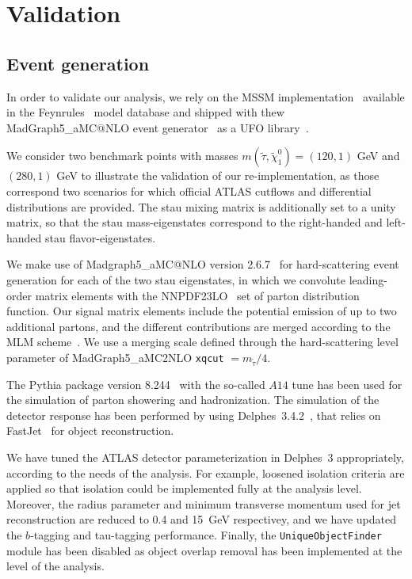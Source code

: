 \documentclass{ws-mpla}
\begin{document}
\section{Validation}\label{sec:val}

\subsection{Event generation}

In order to validate our analysis, we rely on the MSSM implementation~\cite{Duhr:2011se} available in the {\sc Feynrules}~\cite{Alloul:2013bka} model database and shipped with thew {\sc MadGraph5\_aMC@NLO} event generator~\cite{Alwall:2014hca} as a UFO library~\cite{Degrande:2011ua}.

We consider two benchmark points with masses $m(\tilde{\tau},\tilde{\chi}^0_1)=(120,1)$ GeV and $(280,1)$ GeV to illustrate the validation of our re-implementation, as those correspond two scenarios for which official ATLAS cutflows and differential distributions are provided.
The stau mixing matrix is additionally set to a unity matrix, so that the stau mass-eigenstates correspond to the right-handed and left-handed stau flavor-eigenstates.

We make use of {\sc Madgraph5\_aMC@NLO} version 2.6.7~\cite{Alwall:2014hca} for hard-scattering event generation for each of the two stau eigenstates, in which we convolute leading-order matrix elements with the NNPDF23LO~\cite{Ball:2012cx} set of parton distribution function.
Our signal matrix elements include the potential emission of up to two additional partons, and the different contributions are merged according to the MLM scheme~\cite{Mangano:2006rw,Alwall:2008qv}. We use a merging scale defined through the hard-scattering level parameter of {\sc MadGraph5\_aMC2NLO} {\tt xqcut} $= m_{\tilde{\tau}}/4$.

The {\sc Pythia} package version 8.244~\cite{Sjostrand:2014zea} with the so-called $A14$ tune\cite{TheATLAScollaboration:2014rfk} has been used for the simulation of parton showering and hadronization. The simulation of the detector response has been performed by using {\sc Delphes}~3.4.2~\cite{deFavereau:2013fsa}, that relies on {\sc FastJet}~\cite{Cacciari:2011ma} for object reconstruction.

We have tuned the ATLAS detector parameterization in {\sc Delphes}~3 appropriately, according to the needs of the analysis.
For example, loosened isolation criteria are applied so that isolation could be implemented fully at the analysis level.
Moreover, the radius parameter and minimum transverse momentum used for jet reconstruction are reduced to 0.4 and 15~GeV respectivey, and we have updated the $b$-tagging and tau-tagging performance.
Finally, the {\tt UniqueObjectFinder} module has been disabled as object overlap removal has been implemented at the level of the analysis.
\end{document}
